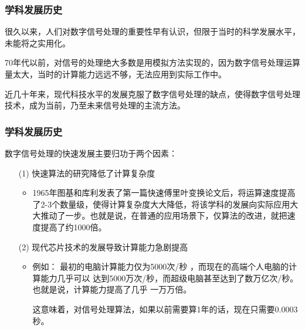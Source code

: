 \documentclass[notheorems,compress,mathserif,table]{beamer}
\begin{document}
%
%
%
%
%
%
\begin{frame}[shrink]\frametitle{  学科发展历史 }%

\quad\quad 很久以来，人们对数字信号处理的重要性早有认识，但限于当时的科学发展水平，未能将之实用化。
\newline

\quad\quad 70年代以前，对信号的处理绝大多数是用模拟方法实现的，因为数字信号处理运算量太大，当时的计算能力远远不够，无法应用到实际工作中。
\newline

\quad\quad 近几十年来，现代科技水平的发展克服了数字信号处理的缺点，使得数字信号处理技术，成为当前，乃至未来信号处理的主流方法。
\newline

\end{frame}
%
%
%
%
%
%
\begin{frame}[shrink]\frametitle{  学科发展历史 }%
数字信号处理的快速发展主要归功于两个因素：
\begin{enumerate}
    \item [(1)]快速算法的研究降低了计算复杂度
        \begin{itemize}
            \item 1965年图基和库利发表了第一篇快速傅里叶变换论文后，将运算速度提高了2-3个数量级，使得计算复杂度大大降低，将该学科的发展向实际应用大大推动了一步。也就是说，在普通的应用场景下，仅算法的改进，就把速度提高了约1000倍。
        \end{itemize}
    \item [(2)]现代芯片技术的发展导致计算能力急剧提高
    \begin{itemize}
        \item  例如： 最初的电脑计算能力仅为5000次/秒 ，而现在的高端个人电脑的计算能力几乎可以
        达到5000万次/秒，而超级电脑甚至达到了数万亿次/秒。也就是说，计算能力提高了几乎
        一万万倍。\par
        这意味着，对信号处理算法，如果以前需要算1年的话，现在只需要0.0003秒。
    \end{itemize}

\end{enumerate}
\end{frame}
\end{document}
